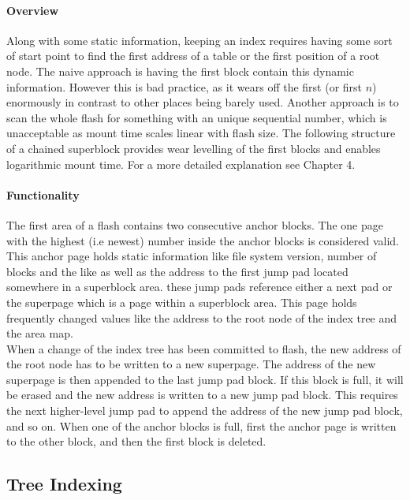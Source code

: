 \paragraph{Overview}
Along with some static information, keeping an index requires having some sort of start point to find the first address of a table or the first position of a root node. The naive approach is having the first block contain this dynamic information. However this is bad practice, as it wears off the first (or first $n$) enormously in contrast to other places being barely used. Another approach is to scan the whole flash for something with an unique sequential number, which is unacceptable as mount time scales linear with flash size.
The following structure of a chained superblock provides wear levelling of the first blocks and enables logarithmic mount time.
For a more detailed explanation see  Chapter 4.

\paragraph{Functionality}
The first area of a flash contains two consecutive anchor blocks. The one page with the highest (i.e newest) number inside the anchor blocks is considered valid. This anchor page holds static information like file system version, number of blocks and the like as well as the address to the first jump pad located somewhere in a superblock area. these jump pads reference either a next pad or the superpage which is a page within a superblock area. This page holds frequently changed values like the address to the root node of the index tree and the area map.\\

When a change of the index tree has been committed to flash, the new address of the root node has to be written to a new superpage. The address of the new superpage is then appended to the last jump pad block. If this block is full, it will be erased and the new address is written to a new jump pad block. This requires the next higher-level jump pad to append the address of the new jump pad block, and so on. When one of the anchor blocks is full, first the anchor page is written to the other block, and then the first block is deleted.\\



\subsection{Tree Indexing}
\label{b+tree}
